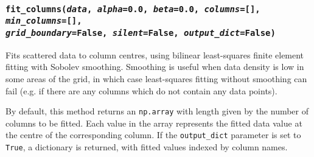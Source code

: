 \begin{snugshade}\subsubsection{\texttt{fit\_columns(\emph{data}, \emph{alpha}=0.0, \emph{beta}=0.0, \emph{columns}=[], \emph{min\_columns}=[], \\
    \emph{grid\_boundary}=False, \emph{silent}=False, \emph{output\_dict}=False)}}\end{snugshade}
\label{sec:mulgrid:fit_columns}

Fits scattered data to column centres, using bilinear least-squares finite element fitting with Sobolev smoothing.  Smoothing is useful when data density is low in some areas of the grid, in which case least-squares fitting without smoothing can fail (e.g. if there are any columns which do not contain any data points).

By default, this method returns an \texttt{np.array} with length given by the number of columns to be fitted. Each value in the array represents the fitted data value at the centre of the corresponding column. If the \texttt{output\_dict} parameter is set to \texttt{True}, a dictionary is returned, with fitted values indexed by column names.

